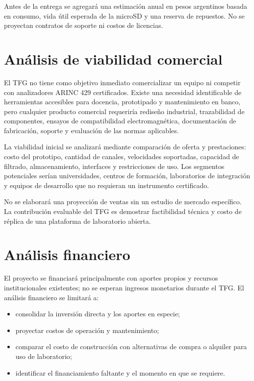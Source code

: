 \documentclass[12pt,a4paper,oneside]{article}
\begin{document}
Antes de la entrega se agregará una estimación anual en pesos argentinos basada en consumo, vida útil esperada de la microSD y una reserva de repuestos. No se proyectan contratos de soporte ni costos de licencias.

\section{Análisis de viabilidad comercial}

El TFG no tiene como objetivo inmediato comercializar un equipo ni competir con analizadores ARINC 429 certificados. Existe una necesidad identificable de herramientas accesibles para docencia, prototipado y mantenimiento en banco, pero cualquier producto comercial requeriría rediseño industrial, trazabilidad de componentes, ensayos de compatibilidad electromagnética, documentación de fabricación, soporte y evaluación de las normas aplicables.

La viabilidad inicial se analizará mediante comparación de oferta y prestaciones: costo del prototipo, cantidad de canales, velocidades soportadas, capacidad de filtrado, almacenamiento, interfaces y restricciones de uso. Los segmentos potenciales serían universidades, centros de formación, laboratorios de integración y equipos de desarrollo que no requieran un instrumento certificado.

No se elaborará una proyección de ventas sin un estudio de mercado específico. La contribución evaluable del TFG es demostrar factibilidad técnica y costo de réplica de una plataforma de laboratorio abierta.

\section{Análisis financiero}

El proyecto se financiará principalmente con aportes propios y recursos institucionales existentes; no se esperan ingresos monetarios durante el TFG. El análisis financiero se limitará a:

\begin{itemize}
  \item consolidar la inversión directa y los aportes en especie;
  \item proyectar costos de operación y mantenimiento;
  \item comparar el costo de construcción con alternativas de compra o alquiler para uso de laboratorio;
  \item identificar el financiamiento faltante y el momento en que se requiere.
\end{itemize}
\end{document}
